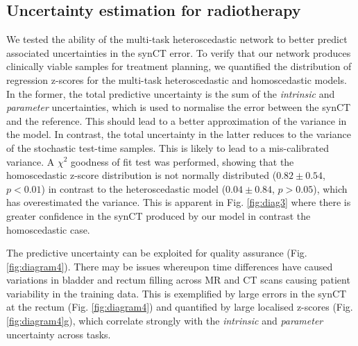 \subsection{Uncertainty estimation for radiotherapy}
We tested the ability of the multi-task heteroscedastic network to better predict associated uncertainties in the synCT error. To verify that our network produces clinically viable samples for treatment planning, we quantified the distribution of regression z-scores for the multi-task heteroscedastic and homoscedastic models. In the former, the total predictive uncertainty is the sum of the \emph{intrinsic} and \emph{parameter} uncertainties, which is used to normalise the error between the synCT and the reference. This should lead to a better approximation of the variance in the model. In contrast, the total uncertainty in the latter reduces to the variance of the stochastic test-time samples. This is likely to lead to a mis-calibrated variance. A $\chi^{2}$ goodness of fit test was performed, showing that the homoscedastic z-score distribution is not normally distributed ($0.82 \pm 0.54$, $p<0.01$) in contrast to the heteroscedastic model ($0.04 \pm 0.84$, $p>0.05$), which has overestimated the variance. This is apparent in Fig. \ref{fig:diag3} where there is greater confidence in the synCT produced by our model in contrast the homoscedastic case.

The predictive uncertainty can be exploited for quality assurance (Fig. \ref{fig:diagram4}). There may be issues whereupon time differences have caused variations in bladder and rectum filling across MR and CT scans causing patient variability in the training data. This is exemplified by large errors in the synCT at the rectum (Fig. \ref{fig:diagram4}) and quantified by large localised z-scores (Fig. \ref{fig:diagram4}g), which correlate strongly with the \emph{intrinsic} and \emph{parameter} uncertainty across tasks.

